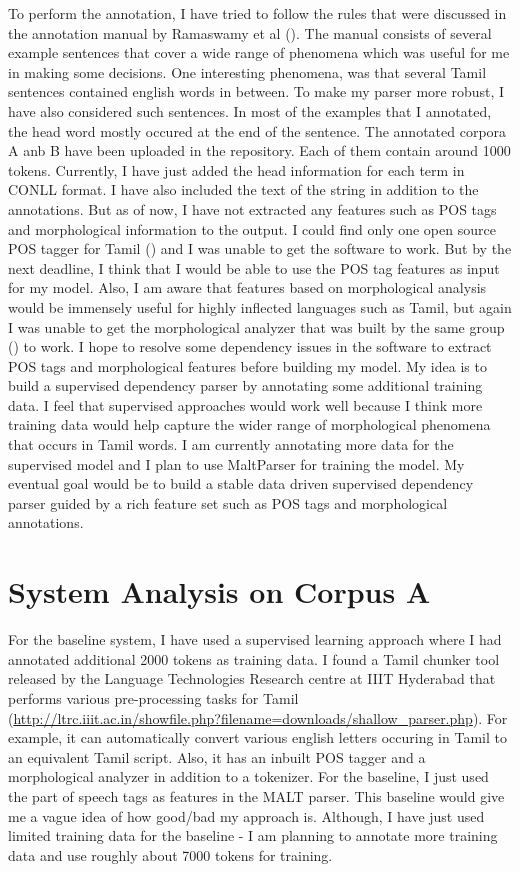 \documentclass[11pt,letterpaper]{article}
\begin{document}
To perform the annotation, I have tried to follow the rules that were discussed in the annotation manual by Ramaswamy et al (\cite{ramReport}).
The manual consists of several example sentences that cover a wide range of phenomena which was useful for me in making
some decisions. One interesting phenomena, was that several Tamil sentences contained english words in between. To make my parser more robust,
I have also considered such sentences. In most of the examples that I annotated, the head word mostly occured at the end of the sentence. The annotated corpora A anb B have been uploaded in the repository. Each of them contain around 1000 tokens. Currently, I have just added the head information for each term
in CONLL format. I have also included the text of the string in addition to the annotations. But as of now, I have not extracted any features such as 
POS tags and morphological information to the output. I could find only one open source POS tagger for Tamil (\cite{dhanalakshmi2010natural}) and I was unable to get the software
to work. But by the next deadline, I think that I would be able to use the POS tag features as input for my model. Also, I am aware that features based
on morphological analysis would be immensely useful for highly inflected languages such as Tamil, but again I was unable to get the morphological 
analyzer that was built by the same group (\cite{dhanalakshmi2010natural}) to work. I hope to resolve some dependency issues in the software to extract
POS tags and morphological features before building my model. My idea is to build a supervised dependency parser by annotating some additional training data. 
I feel that supervised approaches would work well because I think more training data would help capture the wider range of morphological phenomena that occurs in Tamil words. 
I am currently annotating more data for the supervised model and I plan to use MaltParser for training the model. My eventual goal would be
to build a stable data driven supervised dependency parser guided by a rich feature set such as POS tags and morphological annotations. 

\section{System Analysis on Corpus A}
For the baseline system, I have used a supervised learning approach where I had annotated additional 2000 tokens as training data. I found a Tamil chunker tool released
by the Language Technologies Research centre at IIIT Hyderabad that performs various pre-processing tasks for Tamil (\url{http://ltrc.iiit.ac.in/showfile.php?filename=downloads/shallow_parser.php}). For example, it can automatically
convert various english letters occuring in Tamil to an equivalent Tamil script. Also, it has an inbuilt POS tagger and a morphological analyzer in addition 
to a tokenizer. For the baseline, I just used the part of speech tags as features in the MALT parser. This baseline would give me a vague idea
of how good/bad my approach is. Although, I have just used limited training data for the baseline - I am planning to annotate more training data 
and use roughly about 7000 tokens for training. \\
\end{document}
